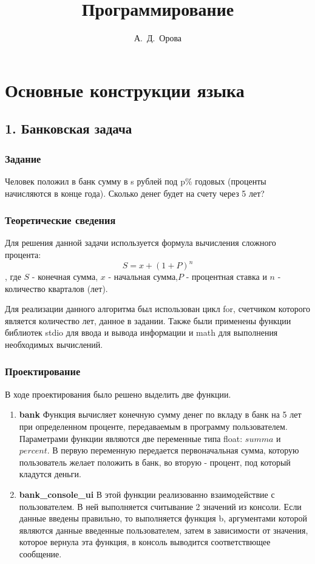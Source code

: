 \documentclass[12pt,a4paper]{report}
\author{А.~Д.~Орова}
\title{Программирование}
\begin{document}
\maketitle
\tableofcontents{}

\chapter{Основные конструкции языка}
\section{1. Банковская задача}
\subsection{Задание}
\hspace{\parindent}
Человек положил в банк сумму в s рублей под p\% годовых (проценты начисляются в конце года). Сколько денег будет на счету через 5 лет? 

\subsection{Теоретические сведения}
\hspace{\parindent}
Для решения данной задачи используется формула вычисления сложного процента: \begin{displaymath} S = x + (1 + P)^{n}  \end{displaymath}, где $S$ - конечная сумма, $x$ - начальная сумма,$P$ - процентная ставка и $n$ - количество кварталов (лет).

Для реализации данного алгоритма был использован цикл for, счетчиком которого является количество лет, данное в задании. Также были применены функции библиотек stdio для ввода и вывода информации и math для выполнения необходимых вычислений.


\subsection{Проектирование}
\hspace{\parindent}
В ходе проектирования было решено выделить две функции.
	\begin{enumerate}
		\item \textbf{bank}
		 Функция вычисляет конечную сумму денег по вкладу в банк на 5 лет при определенном проценте, передаваемым в программу пользователем.
		 Параметрами функции являются две переменные типа float: $summa$ и $percent$. В первую переменную передается первоначальная сумма, которую пользователь желает положить в банк, во вторую - процент, под который кладутся деньги.	 
		\item \textbf{bank\_console\_ui}	 
		 В этой функции реализованно взаимодействие с пользователем. В ней выполняется считывание 2 значений из консоли. Если данные введены правильно, то выполняется функция b, аргументами которой являются данные введенные пользователем, затем в зависимости от значения, которое вернула эта функция, в  консоль выводится соответствющее сообщение. 		
	\end{enumerate}
	
\end{document}
